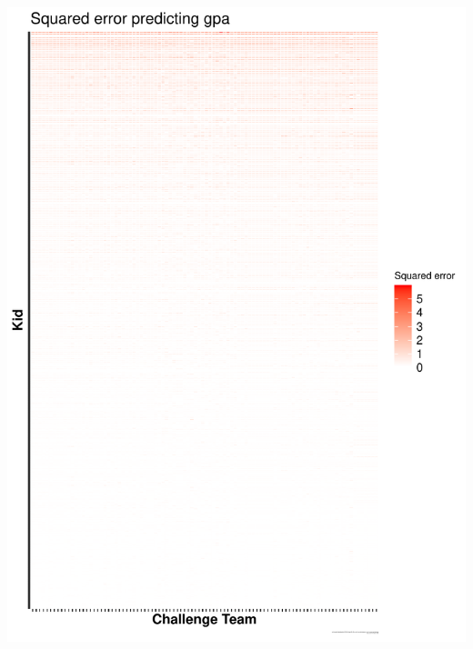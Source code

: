 \documentclass{beamer}
\begin{document}
\begin{frame}
\begin{center}
\includegraphics[width=0.30\textheight]{figures/gpa_ysort_mse_unit_outcome_xsort_mse_account_outcome.pdf}

\end{center}
\end{frame}
\end{document}
